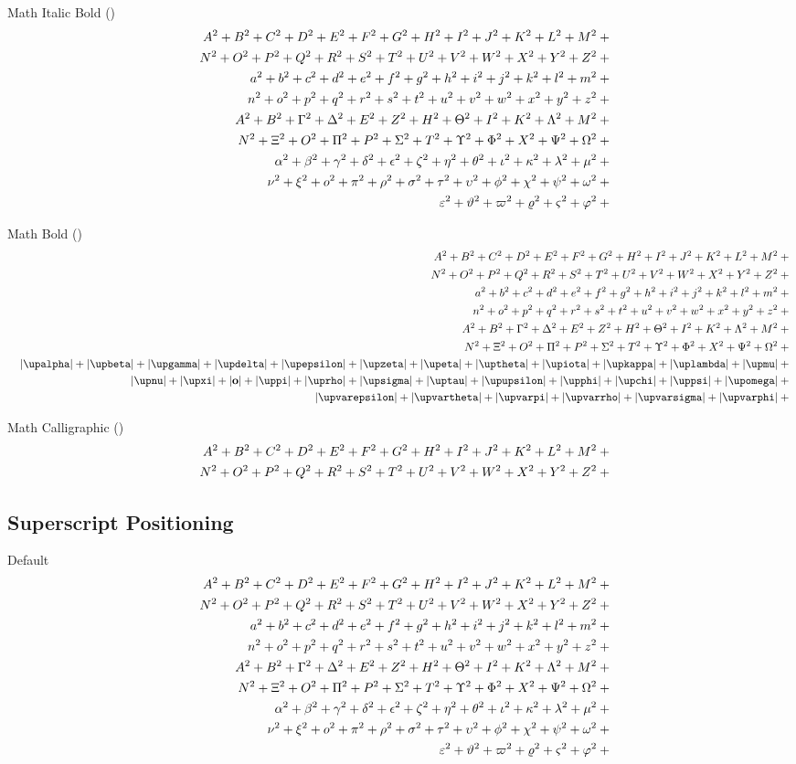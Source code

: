 	Math Italic Bold (\texttt{\string\bm})
	\def\test#1{|\bm{#1}|+{}}%
	\begin{eqnarray*}
	  && {\testupperi}\\
	  && {\testupperii}\\
	  && {\testloweri}\\
	  && {\testlowerii}\\
	  && {\testupgreeki}\\
	  && {\testupgreekii}\\
	  && {\testlowgreeki}\\
	  && {\testlowgreekii}\\
	  && {\testlowgreekiii}
	\end{eqnarray*}%

	Math Bold (\texttt{\string\mathbf})
	\def\test#1{|\mathbf{#1}|+{}}%
	\begin{eqnarray*}
	  && {\testupperi}\\
	  && {\testupperii}\\
	  && {\testloweri}\\
	  && {\testlowerii}\\
	  && {\testupgreeki}\\
	  && {\testupgreekii}\\
	  && {\def\test#1{|\bm{\mathbf{#1}}|+{}}\testlowgreekupi}\\
	  && {\def\test#1{|\bm{\mathbf{#1}}|+{}}\testlowgreekupii}\\
	  && {\def\test#1{|\bm{\mathbf{#1}}|+{}}\testlowgreekupiii}
	\end{eqnarray*}%

	Math Calligraphic (\texttt{\string\mathcal})
	\def\test#1{|\mathcal{#1}|+{}}%
	\begin{eqnarray*}
	  && {\testupperi}\\
	  && {\testupperii}
	\end{eqnarray*}%

	\subsection{Superscript Positioning \showfamily}

	Default
	\def\test#1{#1^{2}+{}}%
	\begin{eqnarray*}
	  && {\testupperi}\\
	  && {\testupperii}\\
	  && {\testloweri}\\
	  && {\testlowerii}\\
	  && {\testupgreeki}\\
	  && {\testupgreekii}\\
	  && {\testlowgreeki}\\
	  && {\testlowgreekii}\\
	  && {\testlowgreekiii}
	\end{eqnarray*}%

